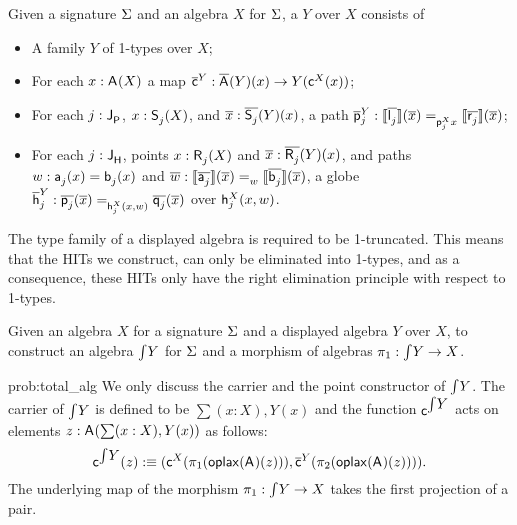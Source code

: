 \begin{definition}\label{def:disp_alg}
Given a signature $\sign$ and an algebra $X$ for $\sign$,
a  $Y$ over $X$ consists of
\begin{itemize}
	\item A family $Y$ of 1-types over $X$;
	\item For each $x : \polyAct{\pointconstr}{X}$ a map $\DispAlgPoint{Y} : \polyDact{\pointconstr}{Y}(x) \rightarrow Y(\AlgPoint{X}(x))$;
	\item For each $j : \pathlabel$, $x : \polyAct{\patharg_j}{X}$, and $\pover{x} : \polyDact{\patharg_j}{Y}(x)$, a path
	$
	\DispAlgPath{Y}{j} : \pathover{\AlgPath{X}{j}{x}}{\pathendpointDact{\pathleft_j}{\pover{x}}}{\pathendpointDact{\pathright_j}{\pover{x}}}
	$;
	\item For each $j : \homotlabel$, points $x : \polyAct{\homotpointarg_j}{X}$ and $\pover{x} : \polyDact{\homotpointarg_j}{Y}(x)$,
	and paths $w : \pathargleft_j(x) = \pathargright_j(x)$ and $\pover{w} : \pathover{w}{\pathendpointDact{\pathargleft_j}{\pover{x}}}{\pathendpointDact{\pathargright_j}{\pover{x}}}$,
	a globe
	$
	\DispAlgHomot{Y}{j} : \globeover{\AlgHomot{X}{j}{(x, w)}}{\homotendpointDact{\homotleft_j}{\xx}}{\homotendpointDact{\homotright_j}{\xx}}
	$
	over $\AlgHomot{X}{j}{(x, w)}$.
\end{itemize}
\end{definition}

\begin{remark}
The type family of a displayed algebra is required to be 1-truncated.
This means that the HITs we construct, can only be eliminated into
1-types, and as a consequence, these HITs only have the right
elimination principle with respect to 1-types.
\end{remark}

\begin{problem}
\label{prob:total_alg}
Given an algebra $X$ for a signature $\sign$ and a displayed algebra $Y$ over $X$,
to construct an algebra $\TotalAlg{Y}$ for $\sign$ and a morphism of algebras $\pi_1 : \TotalAlg{Y} \onecell X$.
\end{problem}

\begin{construction}{prob:total_alg}
\label{constr:total_alg}
We only discuss the carrier and the point constructor of $\TotalAlg{Y}$.
The carrier of $\TotalAlg{Y}$ is defined to be $\sum (x : X), Y(x)$
and the function $\AlgPoint{\TotalAlg Y}$ acts on elements $z : \polyAct{\pointconstr}{\sum (x : X), Y(x)}$ as follows:
\[
\AlgPoint{\TotalAlg Y}(z) \eqdef
(\AlgPoint{X}(\projl(\polyoplax{\pointconstr}(z)))
,
\DispAlgPoint{Y}(\projr(\polyoplax{\pointconstr}(z)))).
\]
The underlying map of the morphism $\pi_1 : \TotalAlg{Y} \onecell X$ takes the first projection of a pair.
\end{construction}

